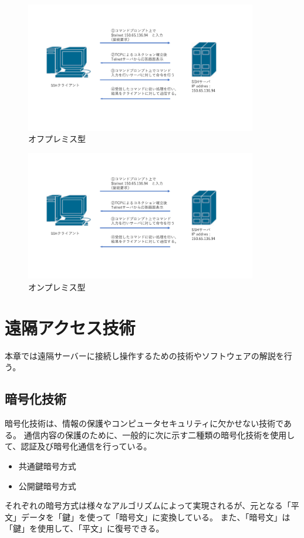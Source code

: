 \documentclass[11pt,a4j,titlepage]{jreport}
\begin{document}
\begin{figure}[tbp]
    \centering
    \includegraphics*[width=0.9\textwidth,page=14]{graphs/network_archtecture.pdf}
    \caption{ オフプレミス型}
    \label{cloud_graph}
\end{figure}


\begin{figure}[tbp]
    \centering
    \includegraphics*[width=0.9\textwidth,page=15]{graphs/network_archtecture.pdf}
    \caption{オンプレミス型}
    \label{onpremise_graph}
\end{figure}




\chapter{遠隔アクセス技術}
本章では遠隔サーバーに接続し操作するための技術やソフトウェアの解説を行う。

\section{暗号化技術}
暗号化技術は、情報の保護やコンピュータセキュリティに欠かせない技術である。
通信内容の保護のために、一般的に次に示す二種類の暗号化技術を使用して、認証及び暗号化通信を行っている。
\begin{itemize}
    \item 共通鍵暗号方式
    \item 公開鍵暗号方式
\end{itemize}
それぞれの暗号方式は様々なアルゴリズムによって実現されるが、元となる「平文」データを「鍵」を使って「暗号文」に変換している。
また、「暗号文」は「鍵」を使用して、「平文」に復号できる。
\end{document}
